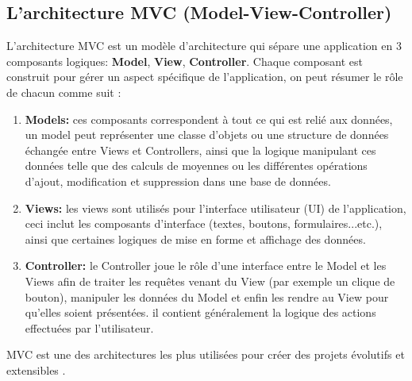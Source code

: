 \subsection{L'architecture MVC (Model-View-Controller)}
L'architecture MVC est un modèle d'architecture qui sépare une application en 3 composants logiques: \textbf{Model}, \textbf{View}, \textbf{Controller}.
Chaque composant est construit pour gérer un aspect spécifique de l'application, on peut résumer le rôle de chacun comme suit :
\begin{enumerate}
	\item \textbf{Models: } ces composants correspondent à tout ce qui est relié aux données, un model peut représenter une classe d'objets ou une structure de données échangée entre Views et Controllers, ainsi que la logique manipulant ces données telle que des calculs de moyennes ou les différentes opérations d'ajout, modification et suppression dans une base de données.
	\item \textbf{Views:} les views sont utilisés pour l'interface utilisateur (UI) de l'application, ceci inclut les composants d'interface (textes, boutons, formulaires...etc.), ainsi que certaines logiques de mise en forme et affichage des données.
	\item \textbf{Controller: } le Controller joue le rôle d'une interface entre le Model et les Views afin de traiter les requêtes venant du View (par exemple un clique de bouton), manipuler les données du Model et enfin les rendre au View pour qu'elles soient présentées. il contient généralement la logique des actions effectuées par l'utilisateur.
\end{enumerate}
	
MVC est une des architectures les plus utilisées pour créer des projets évolutifs et extensibles \cite{refMVC}.

